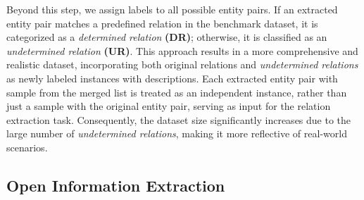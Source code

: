 Beyond this step, we assign labels to all possible entity pairs. If an extracted entity pair matches a predefined relation in the benchmark dataset, it is categorized as a \textit{determined relation} \textbf{(DR)}; otherwise, it is classified as an \textit{undetermined relation} \textbf{(UR)}. This approach results in a more comprehensive and realistic dataset, incorporating both original relations and \textit{undetermined relations} as newly labeled instances with descriptions. Each extracted entity pair with sample from the merged list is treated as an independent instance, rather than just a sample with the original entity pair, serving as input for the relation extraction task. Consequently, the dataset size significantly increases due to the large number of \textit{undetermined relations}, making it more reflective of real-world scenarios.
 





\subsection{Open Information Extraction}
\label{sec:oie}

